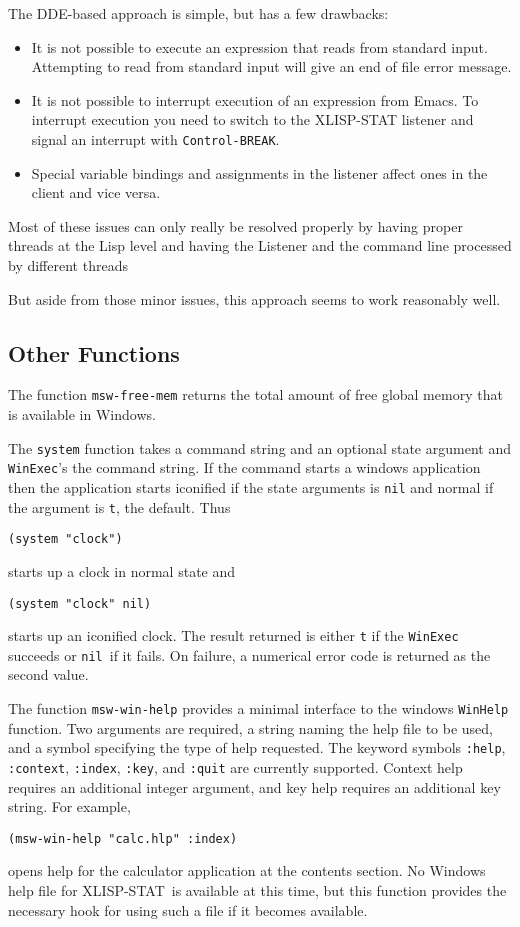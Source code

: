\documentclass[11pt]{article}
\newcommand{\dcode}[1]{{\tt #1}}
\newcommand{\XLS}{XLISP-STAT}
\newcommand{\lkeyword}[1]{{\tt :#1}}
\newcommand{\NIL}{{\tt nil}}
\begin{document}
The DDE-based approach is simple, but has a few drawbacks:
\begin{itemize}
\item It is not possible to execute an expression that reads from
  standard input.  Attempting to read from standard input will give an
  end of file error message.
\item It is not possible to interrupt execution of an expression from
  Emacs.  To interrupt execution you need to switch to the XLISP-STAT
  listener and signal an interrupt with \texttt{Control-BREAK}.
\item Special variable bindings and assignments in the listener affect
  ones in the client and vice versa.
\end{itemize}
Most of these issues can only really be resolved properly by having
proper threads at the Lisp level and having the Listener and the
command line processed by different threads

But aside from those minor issues, this approach seems to work
reasonably well.


\subsection{Other Functions}
The function \dcode{msw-free-mem} returns the total amount of free
global memory that is available in Windows.

The \dcode{system} function takes a command string and an optional
state argument and \dcode{WinExec}'s the command string. If the
command starts a windows application then the application starts
iconified if the state arguments is \dcode{nil} and normal if the
argument is \dcode{t}, the default. Thus
\begin{verbatim}
(system "clock")
\end{verbatim}
starts up a clock in normal state and
\begin{verbatim}
(system "clock" nil)
\end{verbatim}
starts up an iconified clock. The result returned is either \dcode{t}
if the {\tt WinExec} succeeds or \NIL\ if it fails. On failure,
a numerical error code is returned as the second value.

The function \dcode{msw-win-help} provides a minimal interface to the
windows \dcode{WinHelp} function. Two arguments are required, a string
naming the help file to be used, and a symbol specifying the type of
help requested. The keyword symbols \lkeyword{help},
\lkeyword{context}, \lkeyword{index}, \lkeyword{key}, and
\lkeyword{quit} are currently supported.  Context help requires an
additional integer argument, and key help requires an additional key
string. For example,
\begin{verbatim}
(msw-win-help "calc.hlp" :index)
\end{verbatim}
opens help for the calculator application at the contents section.  No
Windows help file for \XLS\ is available at this time, but this
function provides the necessary hook for using such a file if it
becomes available.
\end{document}

